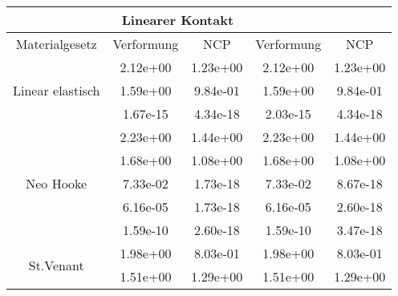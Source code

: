 \begin{table} 
\centering 
\begin{tabular}{c|cc|cc|} 
\cline{2-5} 
 & \multicolumn{2}{|c|}{Linearer Kontakt} &  \\ 
\hline 
\multicolumn{1}{|c|}{Materialgesetz} & \multicolumn{1}{c|}{Verformung} & \multicolumn{1}{c|}{NCP} & \multicolumn{1}{c|}{Verformung} & \multicolumn{1}{c|}{NCP} \\ 
\hline 
\multicolumn{1}{|c|}{\multirow{3}{*}{Linear elastisch}} &\multicolumn{1}{|c|}{  2.12e+00} & \multicolumn{1}{|c|}{  1.23e+00} & \multicolumn{1}{|c|}{  2.12e+00} & \multicolumn{1}{|c|}{  1.23e+00} \\ 
\multicolumn{1}{|c|}{} & \multicolumn{1}{|c|}{  1.59e+00} & \multicolumn{1}{|c|}{  9.84e-01} & \multicolumn{1}{|c|}{  1.59e+00} & \multicolumn{1}{|c|}{  9.84e-01} \\ 
\multicolumn{1}{|c|}{} & \multicolumn{1}{|c|}{  1.67e-15} & \multicolumn{1}{|c|}{  4.34e-18} & \multicolumn{1}{|c|}{  2.03e-15} & \multicolumn{1}{|c|}{  4.34e-18} \\ 
\hline 
\multicolumn{1}{|c|}{\multirow{5}{*}{Neo Hooke}} &\multicolumn{1}{|c|}{  2.23e+00} & \multicolumn{1}{|c|}{  1.44e+00} & \multicolumn{1}{|c|}{  2.23e+00} & \multicolumn{1}{|c|}{  1.44e+00} \\ 
\multicolumn{1}{|c|}{} & \multicolumn{1}{|c|}{  1.68e+00} & \multicolumn{1}{|c|}{  1.08e+00} & \multicolumn{1}{|c|}{  1.68e+00} & \multicolumn{1}{|c|}{  1.08e+00} \\ 
\multicolumn{1}{|c|}{} & \multicolumn{1}{|c|}{  7.33e-02} & \multicolumn{1}{|c|}{  1.73e-18} & \multicolumn{1}{|c|}{  7.33e-02} & \multicolumn{1}{|c|}{  8.67e-18} \\ 
\multicolumn{1}{|c|}{} & \multicolumn{1}{|c|}{  6.16e-05} & \multicolumn{1}{|c|}{  1.73e-18} & \multicolumn{1}{|c|}{  6.16e-05} & \multicolumn{1}{|c|}{  2.60e-18} \\ 
\multicolumn{1}{|c|}{} & \multicolumn{1}{|c|}{  1.59e-10} & \multicolumn{1}{|c|}{  2.60e-18} & \multicolumn{1}{|c|}{  1.59e-10} & \multicolumn{1}{|c|}{  3.47e-18} \\ 
\hline 
\multicolumn{1}{|c|}{\multirow{6}{*}{St.Venant}} &\multicolumn{1}{|c|}{  1.98e+00} & \multicolumn{1}{|c|}{  8.03e-01} & \multicolumn{1}{|c|}{  1.98e+00} & \multicolumn{1}{|c|}{  8.03e-01} \\ 
\multicolumn{1}{|c|}{} & \multicolumn{1}{|c|}{  1.51e+00} & \multicolumn{1}{|c|}{  1.29e+00} & \multicolumn{1}{|c|}{  1.51e+00} & \multicolumn{1}{|c|}{  1.29e+00} \\ 

\end{tabular}
\end{table}
